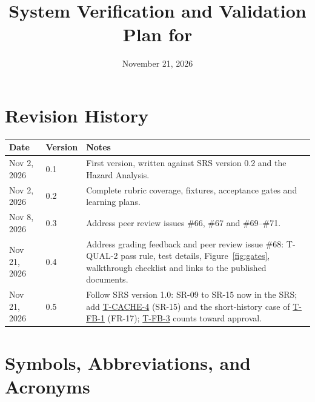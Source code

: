 \documentclass[12pt, titlepage]{article}
\newcommand{\tref}[1]{\hyperref[test:#1]{#1}}
\begin{document}
\title{System Verification and Validation Plan for \progname{}}
\author{\authname}
\date{November 21, 2026}

\maketitle
\setcounter{page}{2}

\section*{Revision History}

\noindent\begin{minipage}{\textwidth}
\begin{tabularx}{\textwidth}{p{3cm}p{2cm}X}
\toprule {\bf Date} & {\bf Version} & {\bf Notes}\\
\midrule
Nov 2, 2026 & 0.1 & First version, written against SRS version 0.2 and the
Hazard Analysis.\\
Nov 2, 2026 & 0.2 & Complete rubric coverage, fixtures, acceptance gates and learning plans.\\
Nov 8, 2026 & 0.3 & Address peer review issues \#66, \#67 and \#69--\#71.\\
Nov 21, 2026 & 0.4 & Address grading feedback and peer review issue \#68:
T-QUAL-2 pass rule, test details, Figure~\ref{fig:gates}, walkthrough
checklist and links to the published documents.\\
Nov 21, 2026 & 0.5 & Follow SRS version 1.0: SR-09 to SR-15 now in the
SRS; add \tref{T-CACHE-4} (SR-15) and the short-history case of
\tref{T-FB-1} (FR-17); \tref{T-FB-3} counts toward approval.\\
\bottomrule
\end{tabularx}
\end{minipage}

\newpage

\tableofcontents

\listoffigures
\listoftables

\newpage

\section{Symbols, Abbreviations, and Acronyms}
\end{document}
